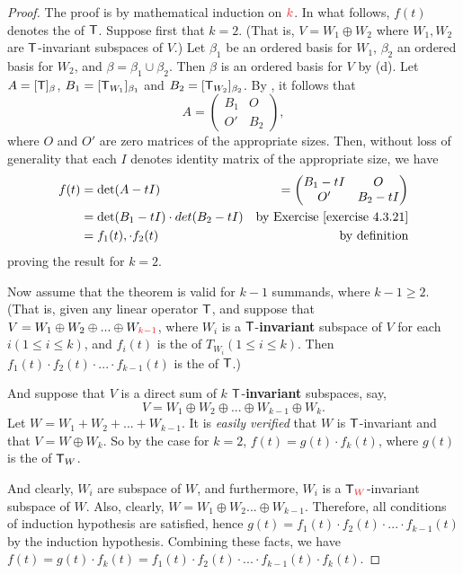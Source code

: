 \begin{proof}
The proof is by mathematical induction on \(\RED{k}\).
In what follows, \(f(t)\) denotes the \CPOLY{} of \(\textsf{T}\).
Suppose first that \(k = 2\).
(That is, \(V = W_1 \oplus W_2\) where \(W_1, W_2\) are \(\textsf{T}\)-invariant subspaces of \(V\).)
Let \(\beta_1\) be an ordered basis for \(W_1\), \(\beta_2\) an ordered basis for \(W_2\), and \(\beta = \beta_1 \cup \beta_2\).
Then \(\beta\) is an ordered basis for \(V\) by (d).
Let \(A = [\textsf{T}]_{\beta}\), \(B_1 = [\textsf{T}_{W_1}]_{\beta_1}\) and \(B_2 = [\textsf{T}_{W_2}]_{\beta_2}\).
By , it follows that
\[
    A = \begin{pmatrix}
        B_1 & O \\
        O' & B_2
    \end{pmatrix},
\]
where \(O\) and \(O'\) are zero matrices of the appropriate sizes.
Then, without loss of generality that each \(I\) denotes identity matrix of the appropriate size, we have
\begin{align*}
    f(t) & = \det(A - tI) & = \begin{pmatrix} B_1 - tI & O \\ O' & B_2 - tI \end{pmatrix}\\
         & = \det(B_1 - tI) \cdot det(B_2 - tI) & \text{by \EXEC{4.3.21}} \\
         & = f_1(t), \cdot f_2(t) & \text{by definition}
\end{align*}
proving the result for \(k = 2\).

Now assume that the theorem is valid for \(k - 1\) summands, where \(k - 1 \ge 2\).
(That is, given any linear operator \(\textsf{T}\), and suppose that \(V = W_1 \oplus W_2 \oplus ... \oplus W_{\RED{k - 1}}\), where \(W_i\) is a \(\textsf{T}\)-\textbf{invariant} subspace of \(V\) for each \(i (1 \le i \le k)\), and \(f_i(t)\) is the \CPOLY{} of \(T_{W_i} (1 \le i \le k)\).
Then \(f_1(t) \cdot f_2(t) \cdot ... \cdot f_{k - 1}(t)\) is the \CPOLY{} of \(\textsf{T}\).)

And suppose that \(V\) is a direct sum of \(k\) \(\textsf{T}\)-\textbf{invariant}\RED{*} subspaces, say,
\[
    V = W_1 \oplus W_2 \oplus ... \oplus W_{k - 1} \oplus W_k.
\]
Let \(W = W_1 + W_2 + ... + W_{k - 1}\).
It is \emph{easily verified} that \(W\) is \(\textsf{T}\)-invariant and that \(V = W \oplus W_k\).
So by the case for \(k = 2\), \(f(t) = g(t) \cdot f_k(t)\), where \(g(t)\) is the \CPOLY{} of \(\textsf{T}_W\).

\RED{**}And clearly, \(W_i\) are subspace of \(W\), and furthermore, \(W_i\) is a \(\T_{\RED{W}}\)-invariant subspace of \(W\).
Also, clearly, \(W = W_1 \oplus W_2 ... \oplus W_{k - 1}\).
Therefore, all conditions of induction hypothesis are satisfied, hence \(g(t) = f_1(t) \cdot f_2(t) \cdot ... \cdot f_{k - 1}(t)\) by the induction hypothesis.
Combining these facts, we have \(f(t) = g(t) \cdot f_k(t) = f_1(t) \cdot f_2(t) \cdot ... \cdot f_{k - 1}(t) \cdot f_k(t)\).
\end{proof}

